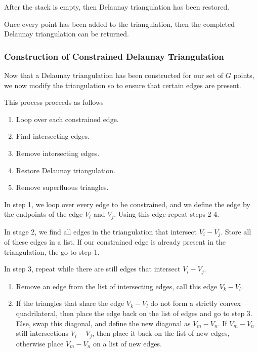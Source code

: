 \documentclass[../fem.tex]{subfiles}
\begin{document}
After the stack is empty, then Delaunay triangulation has been restored.

Once every point has been added to the triangulation, then the completed
Delaunay triangulation can be returned.

\subsubsection{Construction of Constrained Delaunay Triangulation}%
\label{ssub:construction_of_constrained_delaunay_triangulation}

Now that a Delaunay triangulation has been constructed for our set of $G$
points, we now modify the triangulation so to ensure that certain edges are
present.

This process proceeds as follows

\begin{enumerate}[label=\arabic*.]
  \item Loop over each constrained edge.
  \item Find intersecting edges.
  \item Remove intersecting edges.
  \item Restore Delaunay triangulation.
  \item Remove superfluous triangles.
\end{enumerate}

In step 1, we loop over every edge to be constrained, and we define the edge by
the endpoints of the edge $V_i$ and $V_j$. Using this edge repeat steps 2-4.

In stage 2, we find all edges in the triangulation that intersect $V_i-V_j$.
Store all of these edges in a list. If our constrained edge is already present
in the triangulation, the go to step 1.

In step 3, repeat while there are still edges that intersect $V_i-V_j$.
\begin{enumerate}[label=3.\arabic*.]
  \item Remove an edge from the list of intersecting edges, call this edge
    $V_k-V_l$.
  \item If the triangles that share the edge $V_k-V_l$ do not form a strictly
    convex quadrilateral, then place the edge back on the list of edges and go
    to step 3. Else, swap this diagonal, and define the new diagonal as
    $V_m-V_n$. If $V_m-V_n$ still intersections $V_i-V_j$, then place it back
    on the list of new edges, otherwise place $V_m-V_n$ on a list of new edges.
\end{enumerate}
\end{document}
